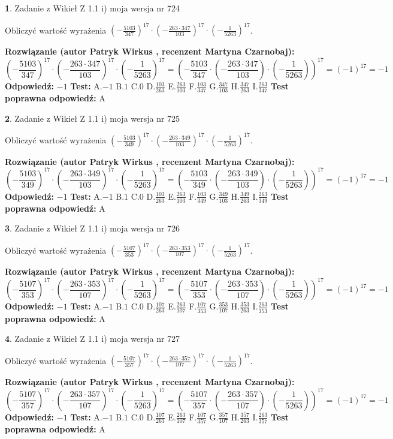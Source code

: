 \documentclass[12pt, a4paper]{article}
\theoremstyle{definition} %
\newtheorem{zad}{}
\newcommand{\zadStart}[1]{\begin{zad}#1\newline}
\newcommand{\zadStop}{\end{zad}}
\newcommand{\rozwStart}[2]{\noindent \textbf{Rozwiązanie (autor #1 , recenzent #2): }\newline}
\newcommand{\rozwStop}{\newline}
\newcommand{\odpStart}{\noindent \textbf{Odpowiedź:}\newline}
\newcommand{\odpStop}{\newline}
\newcommand{\testStart}{\noindent \textbf{Test:}\newline}
\newcommand{\testStop}{\newline}
\newcommand{\kluczStart}{\noindent \textbf{Test poprawna odpowiedź:}\newline}
\newcommand{\kluczStop}{\newline}
\begin{document}
\zadStart{Zadanie z Wikieł Z 1.1 i) moja wersja nr 724}

Obliczyć wartość wyrażenia $(-\frac{5103}{347})^{17} \cdot (-\frac{263 \cdot 347}{103})^{17} \cdot (-\frac{1}{5263})^{17}$.
\zadStop
\rozwStart{Patryk Wirkus}{Martyna Czarnobaj}
$$(-\frac{5103}{347})^{17} \cdot (-\frac{263 \cdot 347}{103})^{17} \cdot (-\frac{1}{5263})^{17} = (-\frac{5103}{347} \cdot (-\frac{263 \cdot 347}{103}) \cdot (-\frac{1}{5263}))^{17} = (-1)^{17} = -1$$
\rozwStop
\odpStart
$-1$
\odpStop
\testStart
A.$-1$ B.$1$ C.$0$ D.$\frac{103}{263}$ E.$\frac{263}{103}$
F.$\frac{103}{347}$ G.$\frac{347}{103}$
H.$\frac{347}{263}$
I.$\frac{263}{347}$
\testStop
\kluczStart
A
\kluczStop



\zadStart{Zadanie z Wikieł Z 1.1 i) moja wersja nr 725}

Obliczyć wartość wyrażenia $(-\frac{5103}{349})^{17} \cdot (-\frac{263 \cdot 349}{103})^{17} \cdot (-\frac{1}{5263})^{17}$.
\zadStop
\rozwStart{Patryk Wirkus}{Martyna Czarnobaj}
$$(-\frac{5103}{349})^{17} \cdot (-\frac{263 \cdot 349}{103})^{17} \cdot (-\frac{1}{5263})^{17} = (-\frac{5103}{349} \cdot (-\frac{263 \cdot 349}{103}) \cdot (-\frac{1}{5263}))^{17} = (-1)^{17} = -1$$
\rozwStop
\odpStart
$-1$
\odpStop
\testStart
A.$-1$ B.$1$ C.$0$ D.$\frac{103}{263}$ E.$\frac{263}{103}$
F.$\frac{103}{349}$ G.$\frac{349}{103}$
H.$\frac{349}{263}$
I.$\frac{263}{349}$
\testStop
\kluczStart
A
\kluczStop



\zadStart{Zadanie z Wikieł Z 1.1 i) moja wersja nr 726}

Obliczyć wartość wyrażenia $(-\frac{5107}{353})^{17} \cdot (-\frac{263 \cdot 353}{107})^{17} \cdot (-\frac{1}{5263})^{17}$.
\zadStop
\rozwStart{Patryk Wirkus}{Martyna Czarnobaj}
$$(-\frac{5107}{353})^{17} \cdot (-\frac{263 \cdot 353}{107})^{17} \cdot (-\frac{1}{5263})^{17} = (-\frac{5107}{353} \cdot (-\frac{263 \cdot 353}{107}) \cdot (-\frac{1}{5263}))^{17} = (-1)^{17} = -1$$
\rozwStop
\odpStart
$-1$
\odpStop
\testStart
A.$-1$ B.$1$ C.$0$ D.$\frac{107}{263}$ E.$\frac{263}{107}$
F.$\frac{107}{353}$ G.$\frac{353}{107}$
H.$\frac{353}{263}$
I.$\frac{263}{353}$
\testStop
\kluczStart
A
\kluczStop



\zadStart{Zadanie z Wikieł Z 1.1 i) moja wersja nr 727}

Obliczyć wartość wyrażenia $(-\frac{5107}{357})^{17} \cdot (-\frac{263 \cdot 357}{107})^{17} \cdot (-\frac{1}{5263})^{17}$.
\zadStop
\rozwStart{Patryk Wirkus}{Martyna Czarnobaj}
$$(-\frac{5107}{357})^{17} \cdot (-\frac{263 \cdot 357}{107})^{17} \cdot (-\frac{1}{5263})^{17} = (-\frac{5107}{357} \cdot (-\frac{263 \cdot 357}{107}) \cdot (-\frac{1}{5263}))^{17} = (-1)^{17} = -1$$
\rozwStop
\odpStart
$-1$
\odpStop
\testStart
A.$-1$ B.$1$ C.$0$ D.$\frac{107}{263}$ E.$\frac{263}{107}$
F.$\frac{107}{357}$ G.$\frac{357}{107}$
H.$\frac{357}{263}$
I.$\frac{263}{357}$
\testStop
\kluczStart
A
\kluczStop
\end{document}
